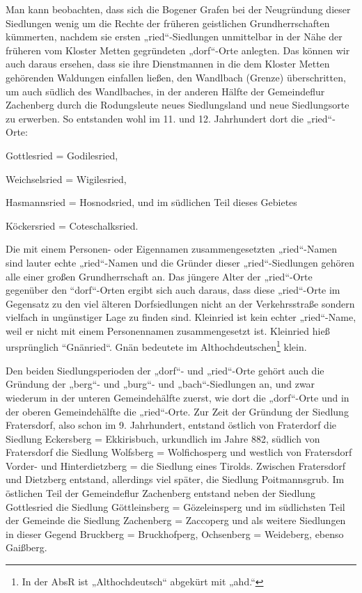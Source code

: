 \documentclass[12pt,a4pager,draft]{book}
\begin{document}
Man kann beobachten, dass sich die Bogener Grafen bei der Neugründung dieser
Siedlungen wenig um die Rechte der früheren geistlichen Grundherrschaften
kümmerten, nachdem sie ersten „ried“-Siedlungen unmittelbar in der Nähe der
früheren vom Kloster Metten gegründeten „dorf“-Orte anlegten. Das können wir
auch daraus ersehen, dass sie ihre Dienstmannen in die dem Kloster Metten
gehörenden Waldungen einfallen ließen, den Wandlbach (Grenze) überschritten, um
auch südlich des Wandlbaches, in der anderen Hälfte der Gemeindeflur Zachenberg
durch die Rodungsleute neues Siedlungsland und neue Siedlungsorte zu erwerben.
So entstanden wohl im 11. und 12. Jahrhundert dort die „ried“-Orte:

Gottlesried = Godilesried,

Weichselsried = Wigilesried,

Hasmannsried = Hosnodsried, und im südlichen Teil dieses Gebietes

Köckersried = Coteschalksried.

Die mit einem Personen- oder Eigennamen zusammengesetzten „ried“-Namen sind
lauter echte „ried“-Namen und die Gründer dieser „ried“-Siedlungen gehören alle
einer großen Grundherrschaft an. Das jüngere Alter der „ried“-Orte gegenüber den
“dorf“-Orten ergibt sich auch daraus, dass diese „ried“-Orte im Gegensatz zu den
viel älteren Dorfsiedlungen nicht an der Verkehrsstraße sondern vielfach in
ungünstiger Lage zu finden sind. Kleinried ist kein echter „ried“-Name, weil er
nicht mit einem Personennamen zusammengesetzt ist. Kleinried hieß ursprünglich
“Gnänried“. Gnän bedeutete im Althochdeutschen\footnote{In der AbsR ist
„Althochdeutsch“ abgekürt mit „ahd.“} klein.

Den beiden Siedlungsperioden der „dorf“- und „ried“-Orte gehört auch die
Gründung der „berg“- und „burg“- und „bach“-Siedlungen an, und zwar wiederum in
der unteren Gemeindehälfte zuerst, wie dort die „dorf“-Orte und in der oberen
Gemeindehälfte die „ried“-Orte. Zur Zeit der Gründung der Siedlung Fratersdorf,
also schon im 9. Jahrhundert, entstand östlich von Fraterdorf die Siedlung
Eckersberg = Ekkirisbuch, urkundlich im Jahre 882, südlich von Fratersdorf die
Siedlung Wolfsberg = Wolfichosperg und westlich von Fratersdorf Vorder- und
Hinterdietzberg = die Siedlung eines Tirolds. Zwischen Fratersdorf und Dietzberg
entstand, allerdings viel später, die Siedlung Poitmannsgrub. Im östlichen Teil
der Gemeindeflur Zachenberg entstand neben der Siedlung Gottlesried die Siedlung
Göttleinsberg = Gözeleinsperg und im südlichsten Teil der Gemeinde die Siedlung
Zachenberg = Zaccoperg und als weitere Siedlungen in dieser Gegend Bruckberg =
Bruckhofperg, Ochsenberg = Weideberg, ebenso Gaißberg.
\end{document}
